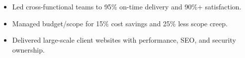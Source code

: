 \vspace{4pt}
\begin{itemize}
  \item Led cross-functional teams to 95\% on-time delivery and 90\%+ satisfaction.
  \item Managed budget/scope for 15\% cost savings and 25\% less scope creep.
\end{itemize}
\vspace{4pt}
\begin{itemize}
  \item Delivered large-scale client websites with performance, SEO, and security ownership.
\end{itemize}
